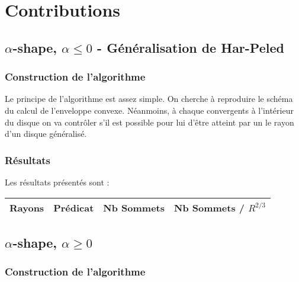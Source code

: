 \section{Contributions}

\subsection{$\alpha$-shape, $\alpha \leq 0$ - Généralisation de Har-Peled}

\subsubsection{Construction de l'algorithme}

Le principe de l’algorithme est assez simple. On cherche à reproduire le schéma du calcul de l’enveloppe convexe. Néanmoins, à chaque convergents à l'intérieur du disque on va contrôler s'il est possible pour lui d'être atteint par un le rayon d'un disque généralisé.

\subsubsection{Résultats}

Les résultats présentés sont : 

\begin{tabular}{|l|c||c|c|}
\hline
Rayons & Prédicat & Nb Sommets & Nb Sommets / $R^{2/3}$\\
\hline

\hline
\end{tabular} 



\subsection{$\alpha$-shape, $\alpha \geq 0$}

\subsubsection{Construction de l'algorithme}


